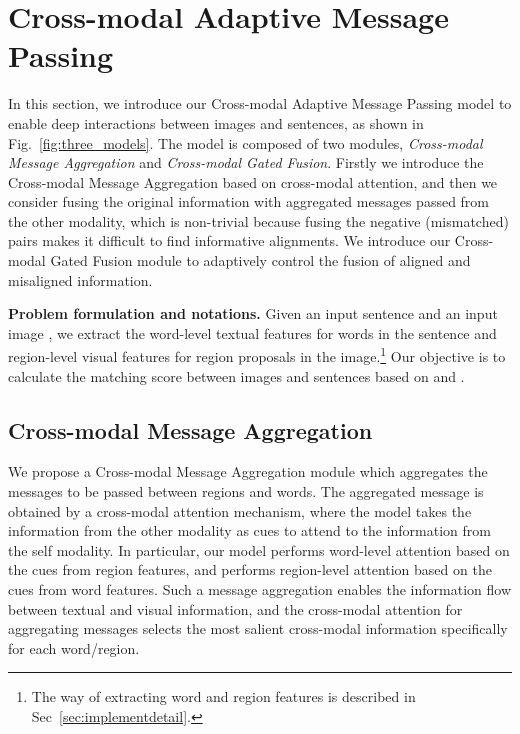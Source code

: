 \documentclass[10pt,twocolumn,letterpaper]{article}
\begin{document}
\vspace{-5pt}
\section{Cross-modal Adaptive Message Passing}
\label{sec:interaction_strategy}





In this section, we introduce our Cross-modal Adaptive Message Passing model to enable deep interactions between images and sentences, as shown in Fig.~\ref{fig:three_models}. 
The model is composed of two modules, \textit{Cross-modal Message Aggregation} and \textit{Cross-modal Gated Fusion}. 
Firstly we introduce the Cross-modal Message Aggregation based on cross-modal attention, and then we consider fusing the original information with aggregated messages passed from the other modality, which is non-trivial because fusing the negative (mismatched) pairs makes it difficult to find informative alignments. 
We introduce our Cross-modal Gated Fusion module to adaptively control the fusion of aligned and misaligned information.

\vspace{0pt}
\noindent\textbf{Problem formulation and notations.} 
Given an input sentence  and an input image , we extract the word-level textual features  for  words in the sentence and region-level visual features  for  region proposals in the image.\footnote{The way of extracting word and region features is described in Sec~\ref{sec:implementdetail}.}
Our objective is to calculate the matching score between images and sentences based on  and . 






\subsection{Cross-modal Message Aggregation}
\label{subsec:attention_integration}






We propose a Cross-modal Message Aggregation module which aggregates the messages to be passed between regions and words. 
The aggregated message is obtained by a cross-modal attention mechanism, where the model takes the information from the other modality as cues to attend to the information from the self modality. 
In particular, our model performs word-level attention based on the cues from region features, and performs region-level attention based on the cues from word features. 
Such a message aggregation enables the information flow between textual and visual information, and the cross-modal attention for aggregating messages selects the most salient cross-modal information specifically for each word/region.
\end{document}
